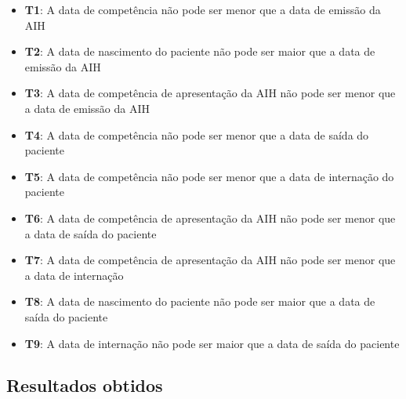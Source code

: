 \documentclass[
  12,
  table]{proadi}
\providecommand{\tightlist}{%
  \setlength{\itemsep}{0pt}\setlength{\parskip}{0pt}}
\begin{document}
\begin{itemize}
\tightlist
\item
  \textbf{T1}: A data de competência não pode ser menor que a data de
  emissão da AIH
\item
  \textbf{T2}: A data de nascimento do paciente não pode ser maior que a
  data de emissão da AIH
\item
  \textbf{T3}: A data de competência de apresentação da AIH não pode ser
  menor que a data de emissão da AIH
\item
  \textbf{T4}: A data de competência não pode ser menor que a data de
  saída do paciente
\item
  \textbf{T5}: A data de competência não pode ser menor que a data de
  internação do paciente
\item
  \textbf{T6}: A data de competência de apresentação da AIH não pode ser
  menor que a data de saída do paciente
\item
  \textbf{T7}: A data de competência de apresentação da AIH não pode ser
  menor que a data de internação
\item
  \textbf{T8}: A data de nascimento do paciente não pode ser maior que a
  data de saída do paciente
\item
  \textbf{T9}: A data de internação não pode ser maior que a data de
  saída do paciente
\end{itemize}

\hypertarget{resultados-obtidos}{%
\subsection*{Resultados obtidos}\label{resultados-obtidos}}

\begingroup\fontsize{10}{12}\selectfont
\end{document}

